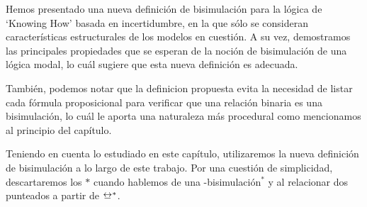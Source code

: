 Hemos presentado una nueva definición de bisimulación para la lógica de `Knowing How' basada en incertidumbre, en la que sólo 
se consideran características estructurales de los modelos en cuestión. A su vez, demostramos las principales propiedades 
que se esperan de la noción de bisimulación de una lógica modal, lo cuál sugiere que esta nueva definición es 
adecuada.

También, podemos notar que la definicion propuesta evita la necesidad de listar cada fórmula proposicional para verificar que una relación binaria
es una bisimulación, lo cuál le aporta una naturaleza más procedural como mencionamos al principio del capítulo.

Teniendo en cuenta lo estudiado en este capítulo, utilizaremos la nueva definición de bisimulación a lo largo de este trabajo.
Por una cuestión de simplicidad, descartaremos los $*$ cuando hablemos de una \KHilogic-bisimulación$^*$ y 
al relacionar dos \ultss punteados a partir de $\bisim^*$.